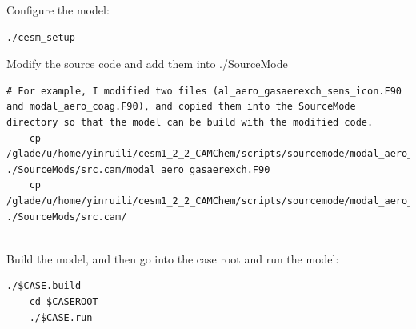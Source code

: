 \documentclass[12pt, fullpage]{uiucthesis2009_2}
\begin{document}
	Configure the model:
	\begin{lstlisting}[xleftmargin=0.01\textwidth, xrightmargin=0.01\textwidth]
	./cesm_setup
	\end{lstlisting}
	
	Modify the source code and add them into ./SourceMode
	\begin{lstlisting}[xleftmargin=0.01\textwidth, xrightmargin=0.01\textwidth]
	# For example, I modified two files (al_aero_gasaerexch_sens_icon.F90 and modal_aero_coag.F90), and copied them into the SourceMode directory so that the model can be build with the modified code. 
	cp /glade/u/home/yinruili/cesm1_2_2_CAMChem/scripts/sourcemode/modal_aero_gasaerexch.F90 ./SourceMods/src.cam/modal_aero_gasaerexch.F90
	cp /glade/u/home/yinruili/cesm1_2_2_CAMChem/scripts/sourcemode/modal_aero_coag.F90 ./SourceMods/src.cam/
	
	\end{lstlisting}
	
	Build the model, and then go into the case root and run the model:
	\begin{lstlisting}[xleftmargin=0.01\textwidth, xrightmargin=0.01\textwidth]
	./$CASE.build
	cd $CASEROOT
	./$CASE.run
	\end{lstlisting}


\appendix*



\backmatter



\end{document}
